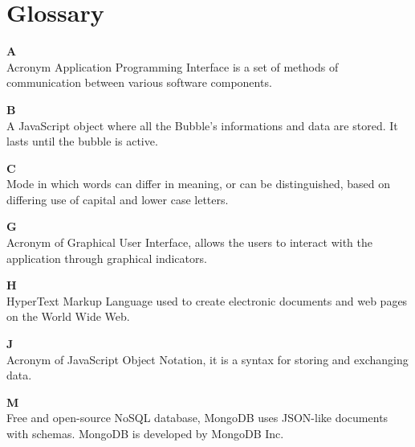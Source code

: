 \section{Glossary}

\textbf{A}\\
Acronym Application Programming Interface is a set of methods of communication between various software components.

\textbf{B}\\
A JavaScript object where all the Bubble's informations and data are stored. It lasts until the bubble is active.

\textbf{C}\\
Mode in which words can differ in meaning, or can be distinguished, based on differing use of capital and lower case letters.

\textbf{G}\\
Acronym of Graphical User Interface, allows the users to interact with the application through graphical indicators.

\textbf{H}\\
HyperText Markup Language used to create electronic documents and web pages on the World Wide Web. 

\textbf{J}\\
Acronym of JavaScript Object Notation, it is a syntax for storing and exchanging data.

\textbf{M}\\
Free and open-source NoSQL database, MongoDB uses JSON-like documents with schemas. MongoDB is developed by MongoDB Inc.
